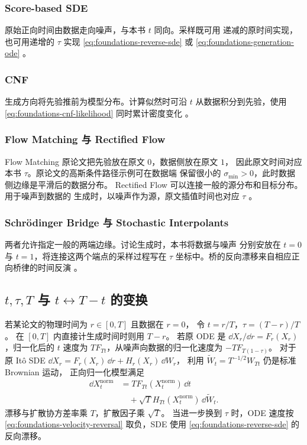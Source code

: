 \subsubsection*{Score-based SDE}
    原始正向时间由数据走向噪声，与本书 \(t\) 同向。采样既可用
    递减的原时间实现，也可用递增的 \(\tau\) 实现
    \eqref{eq:foundations-reverse-sde} 或 \eqref{eq:foundations-generation-ode}
    \cite{song2021sde}。

\subsubsection*{CNF}
    生成方向将先验推前为模型分布。计算似然时可沿 \(t\)
    从数据积分到先验，使用 \eqref{eq:foundations-cnf-likelihood}
    同时累计密度变化 \cite{chen2018neuralode}。

\subsubsection*{Flow Matching 与 Rectified Flow}
    Flow Matching 原论文把先验放在原文 \(0\)，数据侧放在原文 \(1\)，
    因此原文时间对应本书 \(\tau\)。原论文的高斯条件路径示例可在数据端
    保留很小的 \(\sigma_{\min}>0\)，此时数据侧边缘是平滑后的数据分布。
    Rectified Flow 可以连接一般的源分布和目标分布。用于噪声到数据的
    生成时，以噪声作为源，原文插值时间也对应 \(\tau\)
    \cite{lipman2023fm,liu2023rectified}。

\subsubsection*{Schrödinger Bridge 与 Stochastic Interpolants}
    两者允许指定一般的两端边缘。讨论生成时，本书将数据与噪声
    分别安放在 \(t=0\) 与 \(t=1\)，将连接这两个端点的采样过程写在
    \(\tau\) 坐标中。桥的反向漂移来自相应正向桥律的时间反演
    \cite{debortoli2021dsb,albergo2025si}。

\subsection{\texorpdfstring{\(t,\tau,T\)}{t,τ,T} 与 \texorpdfstring{\(t\leftrightarrow T-t\)}{t ↔ T-t} 的变换}

若某论文的物理时间为 \(r\in[0,T]\) 且数据在 \(r=0\)，
令 \(t=r/T\)，\(\tau=(T-r)/T\)。
在 \([0,T]\) 内直接计生成时间时则用 \(T-r\)。
若原 ODE 是 \(\dd X_r/\dd r=F_r(X_r)\)，归一化后的 \(t\) 速度为
\(TF_{Tt}\)，从噪声向数据的归一化速度为 \(-TF_{T(1-\tau)}\)。
对于原 Itô SDE
\(\dd X_r=F_r(X_r)\,\dd r+H_r(X_r)\,\dd W_r\)，
利用 \(\widetilde W_t=T^{-1/2}W_{Tt}\) 仍是标准 Brownian 运动，
正向归一化模型满足
\begin{equation}
  \begin{aligned}
   \dd X^{\mathrm{norm}}_t
     &=T F_{Tt}(X^{\mathrm{norm}}_t)\,\dd t\\
     &\quad+\sqrt T H_{Tt}(X^{\mathrm{norm}}_t)\,\dd\widetilde W_t .
  \end{aligned}
  \label{eq:foundations-time-rescaling}
\end{equation}
漂移与扩散协方差率乘 \(T\)，扩散因子乘 \(\sqrt T\)。
当进一步换到 \(\tau\) 时，ODE 速度按
\eqref{eq:foundations-velocity-reversal} 取负，SDE 使用
\eqref{eq:foundations-reverse-sde} 的反向漂移。

